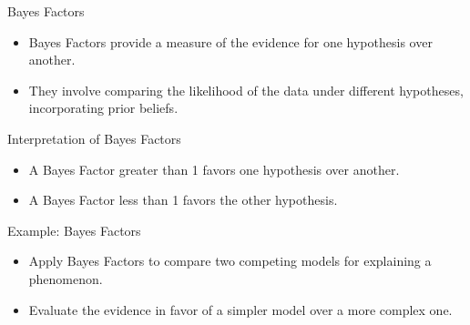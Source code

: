 \documentclass{beamer}
\begin{document}
\begin{frame}{Bayes Factors}
  \begin{itemize}
    \item Bayes Factors provide a measure of the evidence for one hypothesis over another.
    \item They involve comparing the likelihood of the data under different hypotheses, incorporating prior beliefs.
  \end{itemize}
\end{frame}

\begin{frame}{Interpretation of Bayes Factors}
  \begin{itemize}
    \item A Bayes Factor greater than 1 favors one hypothesis over another.
    \item A Bayes Factor less than 1 favors the other hypothesis.
  \end{itemize}
\end{frame}

\begin{frame}{Example: Bayes Factors}
  \begin{itemize}
    \item Apply Bayes Factors to compare two competing models for explaining a phenomenon.
    \item Evaluate the evidence in favor of a simpler model over a more complex one.
  \end{itemize}
\end{frame}
\end{document}
